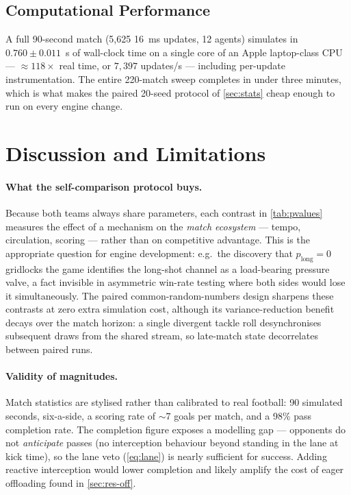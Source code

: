 \documentclass[10pt,twocolumn]{article}
\begin{document}
\subsection{Computational Performance}\label{sec:res-perf}

A full 90-second match (5{,}625 16~ms updates, 12 agents) simulates in
$0.760 \pm 0.011$~s of wall-clock time on a single core of an Apple
laptop-class CPU --- $\approx 118\times$ real time, or $7{,}397$
updates/s --- including per-update instrumentation. The entire 220-match
sweep completes in under three minutes, which is what makes the paired
20-seed protocol of \cref{sec:stats} cheap enough to run on every engine
change.

\section{Discussion and Limitations}\label{sec:discussion}

\paragraph{What the self-comparison protocol buys.} Because both teams
always share parameters, each contrast in \cref{tab:pvalues} measures the
effect of a mechanism on the \emph{match ecosystem} --- tempo, circulation,
scoring --- rather than on competitive advantage. This is the appropriate
question for engine development: e.g.\ the discovery that
$p_{\text{long}}=0$ gridlocks the game identifies the long-shot channel as
a load-bearing pressure valve, a fact invisible in asymmetric win-rate
testing where both sides would lose it simultaneously. The paired
common-random-numbers design sharpens these contrasts at zero extra
simulation cost, although its variance-reduction benefit decays over the
match horizon: a single divergent tackle roll desynchronises subsequent
draws from the shared stream, so late-match state decorrelates between
paired runs.

\paragraph{Validity of magnitudes.} Match statistics are stylised rather
than calibrated to real football: 90 simulated seconds, six-a-side, a
scoring rate of $\sim$7 goals per match, and a 98\% pass completion rate.
The completion figure exposes a modelling gap --- opponents do not
\emph{anticipate} passes (no interception behaviour beyond standing in the
lane at kick time), so the lane veto (\cref{eq:lane}) is nearly
sufficient for success. Adding reactive interception would lower
completion and likely amplify the cost of eager offloading found in
\cref{sec:res-off}.
\end{document}
